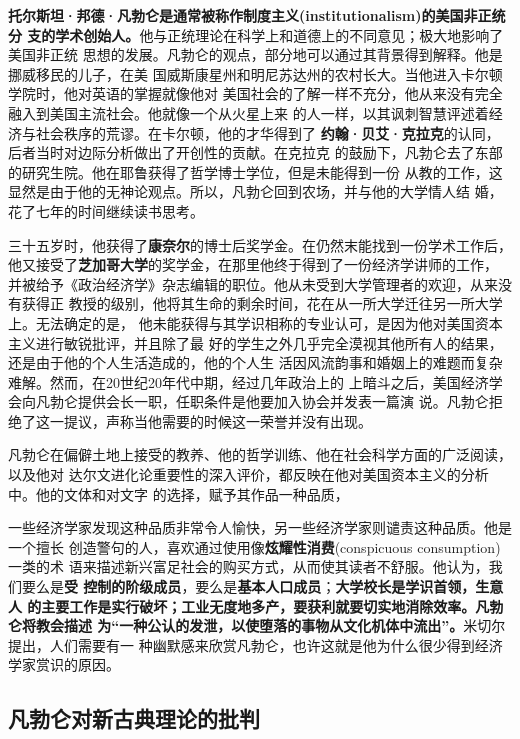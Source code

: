 \textbf{托尔斯坦·邦德·凡勃仑是通常被称作制度主义(institutionalism)的美国非正统分
支的学术创始人。}他与正统理论在科学上和道德上的不同意见；极大地影响了美国非正统
思想的发展。凡勃仑的观点，部分地可以通过其背景得到解释。他是挪威移民的儿子，在美
国威斯康星州和明尼苏达州的农村长大。当他进入卡尔顿学院时，他对英语的掌握就像他对
美国社会的了解一样不充分，他从来没有完全融入到美国主流社会。他就像一个从火星上来
的人一样，以其讽刺智慧评述着经济与社会秩序的荒谬。在卡尔顿，他的才华得到了
\textbf{约翰·贝艾·克拉克}的认同，后者当时对边际分析做出了开创性的贡献。在克拉克
的鼓励下，凡勃仑去了东部的研究生院。他在耶鲁获得了哲学博士学位，但是未能得到一份
从教的工作，这显然是由于他的无神论观点。所以，凡勃仑回到农场，并与他的大学情人结
婚，花了七年的时间继续读书思考。

三十五岁时，他获得了\textbf{康奈尔}的博士后奖学金。在仍然末能找到一份学术工作后，
他又接受了\textbf{芝加哥大学}的奖学金，在那里他终于得到了一份经济学讲师的工作，
并被给予《政治经济学》杂志编辑的职位。他从未受到大学管理者的欢迎，从来没有获得正
教授的级别，他将其生命的剩余时间，花在从一所大学迁往另一所大学上。无法确定的是，
他未能获得与其学识相称的专业认可，是因为他对美国资本主义进行敏锐批评，并且除了最
好的学生之外几乎完全漠视其他所有人的结果，还是由于他的个人生活造成的，他的个人生
活因风流韵事和婚姻上的难题而复杂难解。然而，在20世纪20年代中期，经过几年政治上的
上暗斗之后，美国经济学会向凡勃仑提供会长一职，任职条件是他要加入协会并发表一篇演
说。凡勃仑拒绝了这一提议，声称当他需要的时候这一荣誉并没有出现。

凡勃仑在偏僻土地上接受的教养、他的哲学训练、他在社会科学方面的广泛阅读，以及他对
达尔文进化论重要性的深入评价，都反映在他对美国资本主义的分析中。他的文体和对文字
的选择，赋予其作品一种品质，

一些经济学家发现这种品质非常令人愉快，另一些经济学家则谴责这种品质。他是一个擅长
创造警句的人，喜欢通过使用像\textbf{炫耀性消费}(conspicuous consumption)一类的术
语来描述新兴富足社会的购买方式，从而使其读者不舒服。他认为，我们要么是\textbf{受
控制的阶级成员}，要么是\textbf{基本人口成员}；\textbf{大学校长是学识首领，生意人
的主要工作是实行破坏；工业无度地多产，要获利就要切实地消除效率。凡勃仑将教会描述
为“一种公认的发泄，以使堕落的事物从文化机体中流出”。}米切尔提出，人们需要有一
种幽默感来欣赏凡勃仑，也许这就是他为什么很少得到经济学家赏识的原因。

\subsection{凡勃仑对新古典理论的批判}

